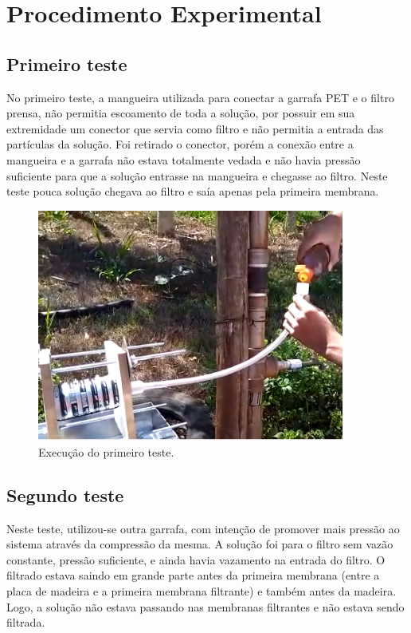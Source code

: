 \chapter{Procedimento Experimental}\label{procedimento}

\section{Primeiro teste}\label{sec:primeiro_teste}

No primeiro teste, a mangueira utilizada para conectar a garrafa PET e o filtro
prensa, não permitia escoamento de toda a solução, por possuir em sua
extremidade um conector que servia como filtro e não permitia a entrada das
partículas da solução. Foi retirado o conector, porém a conexão entre a
mangueira e a garrafa não estava totalmente vedada e não havia pressão
suficiente para que a solução entrasse na mangueira e chegasse ao filtro. Neste
teste pouca solução chegava ao filtro e saía apenas pela primeira membrana.

\begin{figure}[H]
  \centering
  \includegraphics[width=0.9\textwidth]{figuras/primeiro_teste.png}
  \caption{Execução do primeiro teste.\label{fig:primeiro_teste}}
\end{figure}


\section{Segundo teste}\label{sec:segundo_teste}

Neste teste, utilizou-se outra garrafa, com intenção de promover mais pressão ao
sistema através da compressão da mesma. A solução foi para o filtro sem vazão
constante, pressão suficiente, e ainda havia vazamento na entrada do filtro. O
filtrado estava saindo em grande parte antes da primeira membrana (entre a placa
de madeira e a primeira membrana filtrante) e também antes da madeira. Logo, a
solução não estava passando nas membranas filtrantes e não estava sendo
filtrada.

